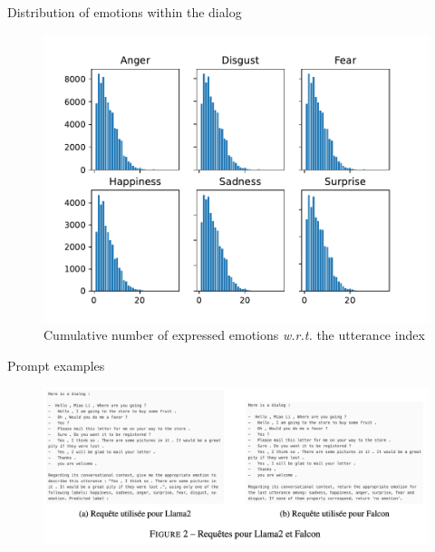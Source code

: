 \documentclass[11pt,aspectratio=169]{beamer}
\begin{document}
    
    \begin{frame}{Distribution of emotions within the dialog}
        \begin{figure}
        \centering
        \includegraphics[scale=0.55]{figures/emo_dist_sp_6_labelled.pdf}
        \caption{\centering Cumulative number of expressed emotions \textit{w.r.t.} the utterance index}
        \label{fig:emo_dist_6}
    \end{figure}
    \end{frame}

    \begin{frame}{Prompt examples}
        \begin{figure}
            \centering
            \includegraphics[width=\textwidth]{prompts.png}
        \end{figure}
    \end{frame}
    
\end{document}

